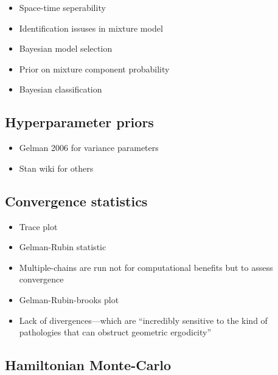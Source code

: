 \documentclass{report}
\begin{document}
\begin{itemize}

\item Space-time seperability

\item Identification issuses in mixture model

\item Bayesian model selection

\item Prior on mixture component probability

\item Bayesian classification

\end{itemize}

\subsection{Hyperparameter priors}

\begin{itemize}

\item Gelman 2006 for variance parameters

\item Stan wiki for others

\end{itemize}

\subsection{Convergence statistics}

\begin{itemize}

\item Trace plot

\item Gelman-Rubin statistic

\item Multiple-chains are run not for computational benefits but to assess convergence

\item Gelman-Rubin-brooks plot

\item Lack of divergences---which are ``incredibly sensitive to the kind of pathologies that can obstruct geometric ergodicity'' 


\end{itemize}


\subsection{Hamiltonian Monte-Carlo}
\end{document}
